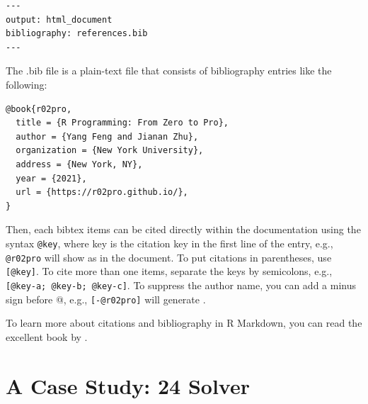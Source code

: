 \documentclass[
]{book}
\begin{document}
\begin{verbatim}
---
output: html_document
bibliography: references.bib  
---
\end{verbatim}

The .bib file is a plain-text file that consists of bibliography entries like the following:

\begin{verbatim}
@book{r02pro,
  title = {R Programming: From Zero to Pro},
  author = {Yang Feng and Jianan Zhu},
  organization = {New York University},
  address = {New York, NY},
  year = {2021},
  url = {https://r02pro.github.io/},
}
\end{verbatim}

Then, each bibtex items can be cited directly within the documentation using the syntax \texttt{@key}, where key is the citation key in the first line of the entry, e.g., \texttt{@r02pro} will show as \citet{r02pro} in the document. To put citations in parentheses, use \texttt{{[}@key{]}}. To cite more than one items, separate the keys by semicolons, e.g., \texttt{{[}@key-a;\ @key-b;\ @key-c{]}}. To suppress the author name, you can add a minus sign before @, e.g., \texttt{{[}-@r02pro{]}} will generate \citeyearpar{r02pro}.

To learn more about citations and bibliography in R Markdown, you can read the excellent book by \citet{xie2020r}.

\hypertarget{case-study}{%
\chapter{A Case Study: 24 Solver}\label{case-study}}

  
\end{document}
